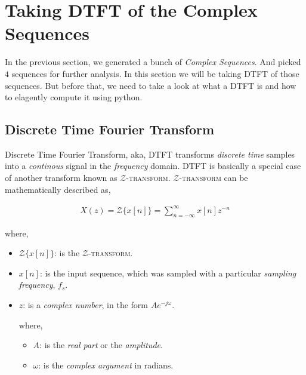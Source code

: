 \documentclass[../../course]{subfiles}
\begin{document}
\def\freqXOne{28}
\def\freqXTwo{56}
\def\freqXThree{56.1}

\section{Taking DTFT of the Complex Sequences} \label{sec:wrkTakingDTFTCplxSeqs}

In the previous section, we generated a bunch of \emph{Complex Sequences}. And
picked $4$ sequences for further analysis. In this section we will be taking
\textsc{DTFT} of those sequences. But before that, we need to take a look at what
a \textsc{DTFT} is and how to elagently compute it using python.

\subsection{Discrete Time Fourier Transform}

Discrete Time Fourier Transform, aka, \textsc{DTFT} transforms \emph{discrete time}
samples into a \emph{continous} signal in the \emph{frequency} domain. \textsc{DTFT}
is basically a special case of another transform known as $\mathcal{Z}$\textsc{-transform}.
$\mathcal{Z}$\textsc{-transform} can be mathematically described as,

\begin{align}
    X(z) = {\mathcal{Z}}\{x[n]\} = \sum_{n = - \infty}^{\infty} x[n] z^{-n}
\end{align}

where,

\begin{itemize} [label=]

    \item ${\mathcal{Z}}\{x[n]\}$: is the $\mathcal{Z}$\textsc{-transform}.
    \item $x[n]$: is the input sequence, which was sampled with a
        particular \emph{sampling frequency}, $f_{s}$.
    \item $z$: is a \emph{complex number}, in the form $A e^{-j \omega}$.

        where,

        \begin{itemize} [label=]
            \item $A$: is the \emph{real part} or the \emph{amplitude}.
            \item $\omega$: is the \emph{complex argument} in radians.
        \end{itemize}

\end{itemize}
\end{document}
